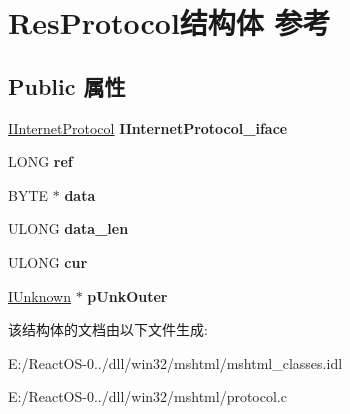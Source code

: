 \hypertarget{class_res_protocol}{}\section{Res\+Protocol结构体 参考}
\label{class_res_protocol}
\subsection*{Public 属性}
\begin{DoxyCompactItemize}
\item 
\mbox{\label{class_res_protocol_a8d7d2baf88425bd0017d80d820eef78e}} 
\hyperlink{interface_i_internet_protocol}{I\+Internet\+Protocol} {\bfseries I\+Internet\+Protocol\+\_\+iface}
\item 
\mbox{\label{class_res_protocol_a545fe9ce8e0fa13ebe3153e9b783ae56}} 
L\+O\+NG {\bfseries ref}
\item 
\mbox{\label{class_res_protocol_ad7c591f8888d1e65beb42a939dcd22dc}} 
B\+Y\+TE $\ast$ {\bfseries data}
\item 
\mbox{\label{class_res_protocol_a1a608f26cfd5bce3dcbcd89e6e612aab}} 
U\+L\+O\+NG {\bfseries data\+\_\+len}
\item 
\mbox{\label{class_res_protocol_a7f7d152cb2d18a28b83e3cefb7b6912b}} 
U\+L\+O\+NG {\bfseries cur}
\item 
\mbox{\label{class_res_protocol_aae2daf9532b1e84ea50fdcad560dd686}} 
\hyperlink{interface_i_unknown}{I\+Unknown} $\ast$ {\bfseries p\+Unk\+Outer}
\end{DoxyCompactItemize}


该结构体的文档由以下文件生成\+:\begin{DoxyCompactItemize}
\item 
E\+:/\+React\+O\+S-\/0../dll/win32/mshtml/mshtml\+\_\+classes.\+idl\item 
E\+:/\+React\+O\+S-\/0../dll/win32/mshtml/protocol.\+c\end{DoxyCompactItemize}
